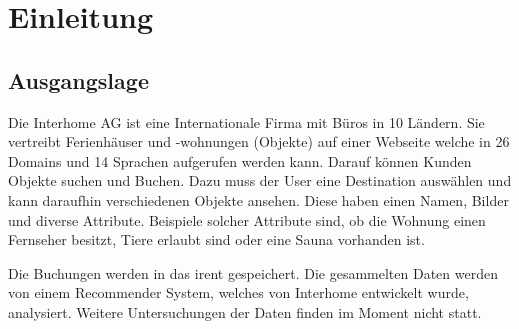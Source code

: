 
\chapter{Einleitung}
\label{sec:einleitung}
 
 


\section{Ausgangslage}
\label{sec:einleitung:ausgangslage}

Die Interhome AG ist eine Internationale Firma mit Büros in 10 Ländern. Sie vertreibt Ferienhäuser und -wohnungen (Objekte) auf einer Webseite welche in 26 Domains und 14 Sprachen aufgerufen werden kann. Darauf können Kunden Objekte suchen und Buchen. Dazu muss der User eine Destination auswählen und kann daraufhin verschiedenen Objekte ansehen. Diese haben einen Namen, Bilder und diverse Attribute. Beispiele solcher Attribute sind, ob die Wohnung einen Fernseher besitzt, Tiere erlaubt sind oder eine Sauna vorhanden ist.

Die Buchungen werden in das \gls{irent} gespeichert. Die gesammelten Daten werden von einem Recommender System, welches von Interhome entwickelt wurde, analysiert. Weitere Untersuchungen der Daten finden im Moment nicht statt.

